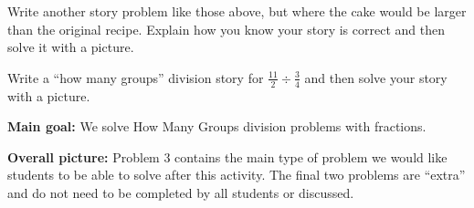 \documentclass[nooutcomes,noauthor, handout]{ximera}
\begin{document}
\begin{problem}
Write another story problem like those above, but where the cake would be larger than the original recipe. Explain how you know your story is correct and then solve it with a picture.
\end{problem}



\begin{problem}
Write a ``how many groups'' division story for $\frac{11}{2} \div \frac{3}{4}$ and then solve your story with a picture.
\end{problem}




\newpage

\begin{instructorNotes} 



{\bf Main goal:} We solve How Many Groups division problems with fractions.


{\bf Overall picture:} Problem 3 contains the main type of problem we would like students to be able to solve after this activity. The final two problems are ``extra'' and do not need to be completed by all students or discussed.


\end{instructorNotes}
\end{document}
